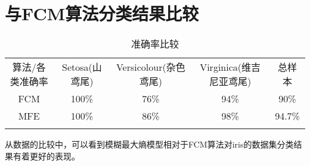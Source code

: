 \section{与FCM算法分类结果比较}
\begin{table}[!ht]
    \label{准确率比较}
    \caption{准确率比较}
    \centering
    \begin{tabular}{c | c c c c}
        \whline 算法/各类准确率 & Setosa(山鸢尾) & Versicolour(杂色鸢尾) & Virginica(维吉尼亚鸢尾) & 总样本 \\\whline
        FCM                     & 100\%          & 76\%                  & 94\%                    & 90\%   \\
        MFE                     & 100\%          & 86\%                  & 98\%                    & 94.7\% \\
        \whline
    \end{tabular}
\end{table}
从数据的比较中，可以看到模糊最大熵模型相对于FCM算法对iris的数据集分类结果有着更好的表现。